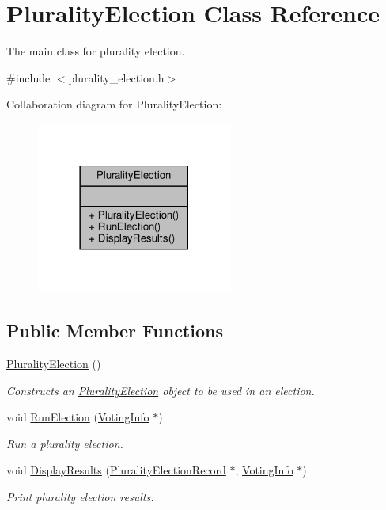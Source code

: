 \hypertarget{classPluralityElection}{}\section{Plurality\+Election Class Reference}
\label{classPluralityElection}


The main class for plurality election.  




{\ttfamily \#include $<$plurality\+\_\+election.\+h$>$}



Collaboration diagram for Plurality\+Election\+:\nopagebreak
\begin{figure}[H]
\begin{center}
\leavevmode
\includegraphics[width=182pt]{classPluralityElection__coll__graph}
\end{center}
\end{figure}
\subsection*{Public Member Functions}
\begin{DoxyCompactItemize}
\item 
\mbox{\label{classPluralityElection_a9def74d2543d2c9cd71ef5f18a379dc6}} 
\hyperlink{classPluralityElection_a9def74d2543d2c9cd71ef5f18a379dc6}{Plurality\+Election} ()
\begin{DoxyCompactList}\small\item\em Constructs an \hyperlink{classPluralityElection}{Plurality\+Election} object to be used in an election. \end{DoxyCompactList}\item 
void \hyperlink{classPluralityElection_aef5d1b066923d289571e49cc5d9836e7}{Run\+Election} (\hyperlink{classVotingInfo}{Voting\+Info} $\ast$)
\begin{DoxyCompactList}\small\item\em Run a plurality election. \end{DoxyCompactList}\item 
void \hyperlink{classPluralityElection_a7e2e3eb5e4ccdff5f9f57a7a17148608}{Display\+Results} (\hyperlink{classPluralityElectionRecord}{Plurality\+Election\+Record} $\ast$, \hyperlink{classVotingInfo}{Voting\+Info} $\ast$)
\begin{DoxyCompactList}\small\item\em Print plurality election results. \end{DoxyCompactList}\end{DoxyCompactItemize}


